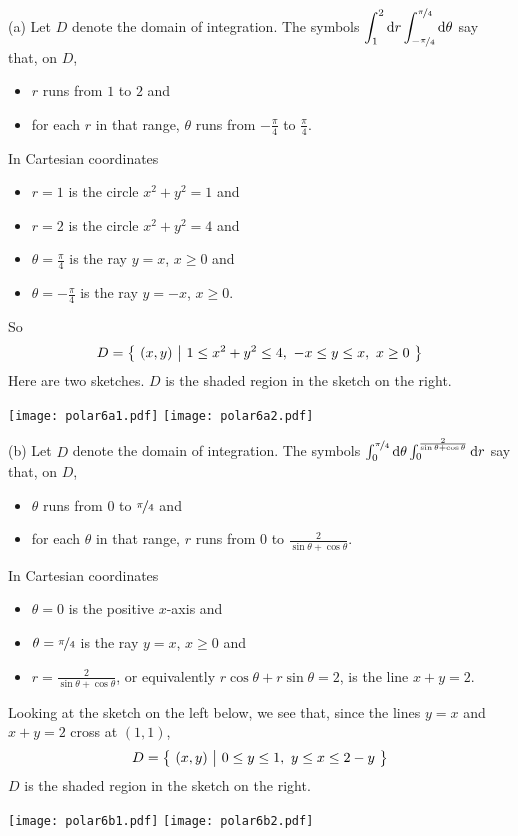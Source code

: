 \begin{solution}
(a)
Let $D$ denote the domain of integration. The symbols
$\displaystyle 
      \int_1^2\mathrm{d}r
     \int_{-\nicefrac{\pi}{4}}^{\nicefrac{\pi}{4}}\mathrm{d}\theta$ 
say that, on $D$,
\begin{itemize}
\item 
$r$ runs from $1$ to $2$ and
\item 
for each $r$ in that range,
$\theta$ runs from $-\frac{\pi}{4}$ to $\frac{\pi}{4}$.
\end{itemize}
In Cartesian coordinates
\begin{itemize}
\item 
$r=1$ is the circle $x^2+y^2=1$ and
\item 
$r=2$ is the circle $x^2+y^2=4$ and
\item
$\theta=\frac{\pi}{4}$ is the ray $y=x$, $x\ge 0$ and
\item 
$\theta=-\frac{\pi}{4}$ is the ray $y=-x$, $x\ge 0$.

\end{itemize}
So
\begin{align*}
D=\big\{ \ (x,y)\ \big|\ 1\le x^2+y^2\le 4,\ -x\le y\le x,\ x\ge 0\ \big\}
\end{align*}
Here are two sketches. $D$ is the shaded region in the sketch on the right.
\begin{center}
     \texttt{[image: polar6a1.pdf]}\quad
     \texttt{[image: polar6a2.pdf]}
\end{center}

(b)
Let $D$ denote the domain of integration. The symbols
$\int_0^{\nicefrac{\pi}{4}}\mathrm{d}\theta
     \int_0^{\frac{2}{\sin\theta+\cos\theta}}\mathrm{d}r$ 
say that, on $D$,
\begin{itemize}
\item 
$\theta$ runs from $0$ to $\nicefrac{\pi}{4}$ and
\item 
for each $\theta$ in that range,
$r$ runs from $0$ to $\frac{2}{\sin\theta+\cos\theta}$.
\end{itemize}
In Cartesian coordinates
\begin{itemize}
\item 
$\theta=0$ is the positive $x$-axis and
\item
$\theta=\nicefrac{\pi}{4}$ is the ray $y=x$, $x\ge 0$ and
\item 
$r=\frac{2}{\sin\theta+\cos\theta}$, or equivalently
$r\cos\theta+r\sin\theta=2$, is the line $x+y=2$.
\end{itemize}
Looking at the sketch on the left below, we see that,
since the lines $y=x$ and $x+y=2$ cross at $(1,1)$,
\begin{align*}
D=\big\{ \ (x,y)\ \big|\ 0\le y\le 1,\ y\le x\le 2-y\ \big\}
\end{align*}
$D$ is the shaded region in the sketch on the right.
\begin{center}
     \texttt{[image: polar6b1.pdf]}\qquad\qquad
     \texttt{[image: polar6b2.pdf]}
\end{center}



\end{solution}
